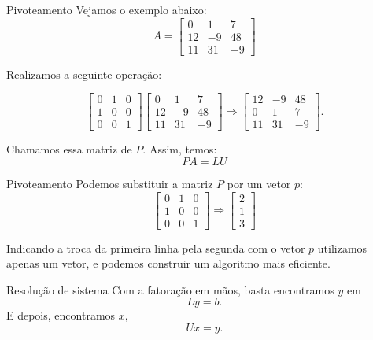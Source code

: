 \documentclass[]{beamer}
\begin{document}
\begin{frame}{Pivoteamento}
Vejamos o exemplo abaixo:
$$A=\begin{bmatrix}0&1&7\\ 12&-9&48\\ 11&31&-9\end{bmatrix}$$

Realizamos a seguinte operação: 

$$\begin{bmatrix}0&1&0\\ 1&0&0\\ 0&0&1\end{bmatrix} \begin{bmatrix}0&1&7\\ 12&-9&48\\ 11&31&-9\end{bmatrix} \Rightarrow \begin{bmatrix}12&-9&48\\ 0&1&7\\ 11&31&-9\end{bmatrix}.$$ 

Chamamos essa matriz de $P$. Assim, temos:	$$PA=LU$$

\end{frame}

\begin{frame}{Pivoteamento}
Podemos substituir a matriz $P$ por um vetor $p:$
$$\begin{bmatrix}0&1&0\\ 1&0&0\\ 0&0&1\end{bmatrix} \Rightarrow \begin{bmatrix}2\\ 1\\ 3\end{bmatrix} $$

Indicando a troca da primeira linha pela segunda com o vetor $p$ utilizamos apenas um vetor, e podemos construir um algoritmo mais eficiente.

\end{frame}


\begin{frame}{Resolução de sistema}
Com a fatoração em mãos, basta encontramos $y$ em
$$Ly=b. $$
E depois, encontramos $x,$
$$ Ux=y.$$
\end{frame}
\end{document}
